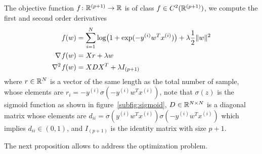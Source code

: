The objective function $f\colon\mathbb{R}^{(p+1)}\to\mathbb{R}$ is of class $f\in C^2(\mathbb{R}^{(p+1)})$, we compute the first and second order derivatives
\begin{subequations}\label{eq:f-df-ddf}
\begin{align}
\operatorname*{\mathit{f}}(w) &= \sum_{i=1}^N\log\bigl(1+\exp(-y^{(i)}w^Tx^{(i)})\bigr)+\lambda\frac{1}{2}\lVert w\rVert^2 \label{subeq:obj-fun} \\
\nabla\operatorname*{\mathit{f}}(w) &= Xr+\lambda w \label{subeq:jacobian} \\
\nabla^2\operatorname*{\mathit{f}}(w) &= XDX^T+\lambda I_{(p+1)}\label{subeq:hessian}
\end{align}
\end{subequations}
where $r\in\mathbb{R}^N$ is a vector of the same length as the total number of sample, whose elements are $r_i=-y^{(i)}\sigma(-y^{(i)}w^Tx^{(i)})$, note that $\sigma(z)$ is the sigmoid function as shown in figure~\vref{subfig:sigmoid}, $D\in\mathbb{R}^{N\times N}$ is a diagonal matrix whose elements are $d_{ii}=\sigma(y^{(i)}w^Tx^{(i)})\sigma(-y^{(i)}w^Tx^{(i)})$ which implies $d_{ii}\in(0,1)$, and $I_{(p+1)}$ is the identity matrix with size $p+1$.




The next proposition allows to address the optimization problem.

